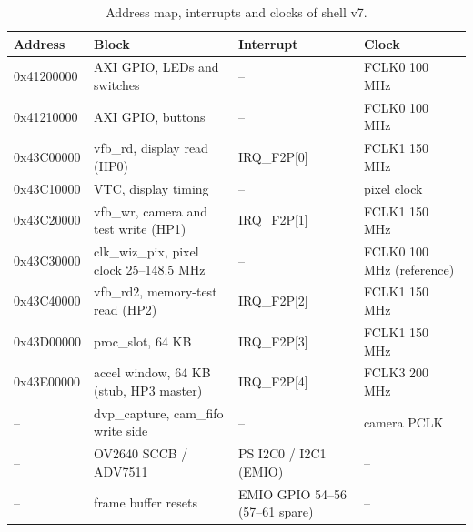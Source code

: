 \documentclass[10pt]{article}
\begin{document}
\begin{table}[p]
\centering
\caption{Address map, interrupts and clocks of shell v7.}
\label{tab:map}
\small
\begin{tabular}{@{}llll@{}}
\toprule
Address & Block & Interrupt & Clock \\
\midrule
0x41200000 & AXI GPIO, LEDs and switches & -- & FCLK0 100 MHz \\
0x41210000 & AXI GPIO, buttons & -- & FCLK0 100 MHz \\
0x43C00000 & vfb\_rd, display read (HP0) & IRQ\_F2P[0] & FCLK1 150 MHz \\
0x43C10000 & VTC, display timing & -- & pixel clock \\
0x43C20000 & vfb\_wr, camera and test write (HP1) & IRQ\_F2P[1] & FCLK1 150 MHz \\
0x43C30000 & clk\_wiz\_pix, pixel clock 25--148.5 MHz & -- & FCLK0 100 MHz (reference) \\
0x43C40000 & vfb\_rd2, memory-test read (HP2) & IRQ\_F2P[2] & FCLK1 150 MHz \\
0x43D00000 & proc\_slot, 64 KB & IRQ\_F2P[3] & FCLK1 150 MHz \\
0x43E00000 & accel window, 64 KB (stub, HP3 master) & IRQ\_F2P[4] & FCLK3 200 MHz \\
-- & dvp\_capture, cam\_fifo write side & -- & camera PCLK \\
-- & OV2640 SCCB / ADV7511 & PS I2C0 / I2C1 (EMIO) & -- \\
-- & frame buffer resets & EMIO GPIO 54--56 (57--61 spare) & -- \\
\bottomrule
\end{tabular}
\end{table}
\end{document}
